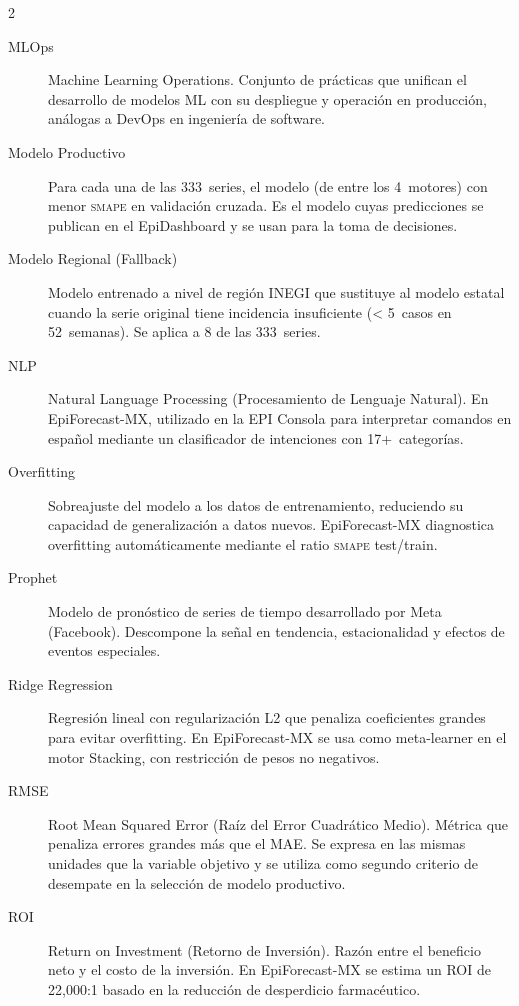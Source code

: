 \documentclass[12pt, letterpaper]{article}
\newcommand{\smape}{\textnormal{\textsc{smape}}}
\begin{document}
\begin{multicols}{2}
\begin{description}
\item[MLOps]
Machine Learning Operations. Conjunto de prácticas que unifican el desarrollo de modelos ML con su despliegue y operación en producción, análogas a DevOps en ingeniería de software.

\item[Modelo Productivo]
Para cada una de las 333~series, el modelo (de entre los 4~motores) con menor \smape{} en validación cruzada. Es el modelo cuyas predicciones se publican en el EpiDashboard y se usan para la toma de decisiones.

\item[Modelo Regional (Fallback)]
Modelo entrenado a nivel de región INEGI que sustituye al modelo estatal cuando la serie original tiene incidencia insuficiente (< 5~casos en 52~semanas). Se aplica a 8 de las 333~series.

\item[NLP]
Natural Language Processing (Procesamiento de Lenguaje Natural). En EpiForecast-MX, utilizado en la EPI Consola para interpretar comandos en español mediante un clasificador de intenciones con 17+~categorías.

\item[Overfitting]
Sobreajuste del modelo a los datos de entrenamiento, reduciendo su capacidad de generalización a datos nuevos. EpiForecast-MX diagnostica overfitting automáticamente mediante el ratio \smape{} test/train.

\item[Prophet]
Modelo de pronóstico de series de tiempo desarrollado por Meta (Facebook). Descompone la señal en tendencia, estacionalidad y efectos de eventos especiales.

\item[Ridge Regression]
Regresión lineal con regularización L2 que penaliza coeficientes grandes para evitar overfitting. En EpiForecast-MX se usa como meta-learner en el motor Stacking, con restricción de pesos no negativos.

\item[RMSE]
Root Mean Squared Error (Raíz del Error Cuadrático Medio). Métrica que penaliza errores grandes más que el MAE. Se expresa en las mismas unidades que la variable objetivo y se utiliza como segundo criterio de desempate en la selección de modelo productivo.

\item[ROI]
Return on Investment (Retorno de Inversión). Razón entre el beneficio neto y el costo de la inversión. En EpiForecast-MX se estima un ROI de 22,000:1 basado en la reducción de desperdicio farmacéutico.


\end{description}
\end{multicols}
\end{document}
